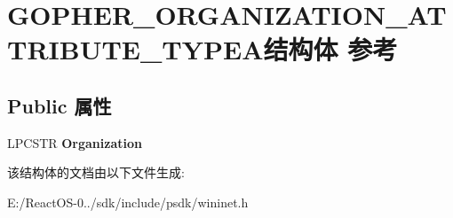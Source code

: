 \hypertarget{struct_g_o_p_h_e_r___o_r_g_a_n_i_z_a_t_i_o_n___a_t_t_r_i_b_u_t_e___t_y_p_e_a}{}\section{G\+O\+P\+H\+E\+R\+\_\+\+O\+R\+G\+A\+N\+I\+Z\+A\+T\+I\+O\+N\+\_\+\+A\+T\+T\+R\+I\+B\+U\+T\+E\+\_\+\+T\+Y\+P\+E\+A结构体 参考}
\label{struct_g_o_p_h_e_r___o_r_g_a_n_i_z_a_t_i_o_n___a_t_t_r_i_b_u_t_e___t_y_p_e_a}
\subsection*{Public 属性}
\begin{DoxyCompactItemize}
\item 
\mbox{\label{struct_g_o_p_h_e_r___o_r_g_a_n_i_z_a_t_i_o_n___a_t_t_r_i_b_u_t_e___t_y_p_e_a_ac2caab50a94b812a3240a4e8b66e9e41}} 
L\+P\+C\+S\+TR {\bfseries Organization}
\end{DoxyCompactItemize}


该结构体的文档由以下文件生成\+:\begin{DoxyCompactItemize}
\item 
E\+:/\+React\+O\+S-\/0../sdk/include/psdk/wininet.\+h\end{DoxyCompactItemize}
